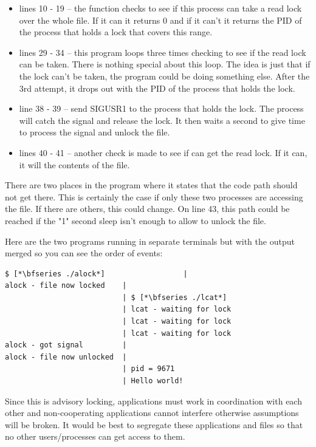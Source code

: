 \begin{itemize}
	\item lines 10 - 19 -- the  function checks to see if this process can take a read lock over
		the whole file. If it can it returns 0 and if it can't it returns the PID of the process that holds a lock that covers
		this range.
	\item lines 29 - 34 --  this program loops three times checking to see if the read lock can be taken. There is 
		nothing special about this loop. The idea is just that if the lock can't be taken, the program could be doing
		something else. After the 3rd attempt, it drops out with the PID of the process that holds the lock.
	\item line 38 - 39 -- send SIGUSR1 to the process that holds the lock. The  process will catch the signal
		and release the lock. It then waits a second to give  time to process the signal and unlock the file.
	\item lines 40 - 41 -- another check is made to see if  can get the read lock. If it can, it will 
		the contents of the file.
\end{itemize}

\noindent
There are two places in the program where it states that the code path should not get there. This is certainly the case if only these two processes are accessing the file. If there are others, this could change. On line 43, this path could be reached if the "1" second sleep isn't enough to allow  to unlock the file.

Here are the two programs running in separate terminals but with the output merged so you can see the order of events:

\begin{lstlisting}
$ [*\bfseries ./alock*]                  |   
alock - file now locked    | 
                           | $ [*\bfseries ./lcat*]
                           | lcat - waiting for lock 
                           | lcat - waiting for lock 
                           | lcat - waiting for lock 
alock - got signal         | 
alock - file now unlocked  | 
                           | pid = 9671
                           | Hello world!
\end{lstlisting}

\noindent
Since this is advisory locking, applications must work in coordination with each other and non-cooperating applications cannot interfere otherwise assumptions will be broken. It would be best to segregate these applications and files so that no other users/processes can get access to them.

